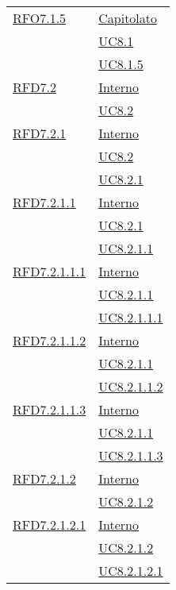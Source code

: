 \begin{longtable}{|>{\centering}m{5cm}|m{5cm}<{\centering}|}
\hyperlink{RFO7.1.5}{RFO7.1.5} & \hyperlink{Capitolato}{Capitolato}\\
& \hyperref[UC8.1]{UC8.1}\\
& \hyperref[UC8.1.5]{UC8.1.5}\\ \hline

\hyperlink{RFD7.2}{RFD7.2} & \hyperlink{Interno}{Interno}\\
& \hyperref[UC8.2]{UC8.2}\\ \hline

\hyperlink{RFD7.2.1}{RFD7.2.1} & \hyperlink{Interno}{Interno}\\
& \hyperref[UC8.2]{UC8.2}\\
& \hyperref[UC8.2.1]{UC8.2.1}\\ \hline

\hyperlink{RFD7.2.1.1}{RFD7.2.1.1} & \hyperlink{Interno}{Interno}\\
& \hyperref[UC8.2.1]{UC8.2.1}\\
& \hyperref[UC8.2.1.1]{UC8.2.1.1}\\ \hline

\hyperlink{RFD7.2.1.1.1}{RFD7.2.1.1.1} & \hyperlink{Interno}{Interno}\\
& \hyperref[UC8.2.1.1]{UC8.2.1.1}\\
& \hyperref[UC8.2.1.1.1]{UC8.2.1.1.1}\\ \hline

\hyperlink{RFD7.2.1.1.2}{RFD7.2.1.1.2} & \hyperlink{Interno}{Interno}\\
& \hyperref[UC8.2.1.1]{UC8.2.1.1}\\
& \hyperref[UC8.2.1.1.2]{UC8.2.1.1.2}\\ \hline

\hyperlink{RFD7.2.1.1.3}{RFD7.2.1.1.3} & \hyperlink{Interno}{Interno}\\
& \hyperref[UC8.2.1.1]{UC8.2.1.1}\\
& \hyperref[UC8.2.1.1.3]{UC8.2.1.1.3}\\ \hline

\hyperlink{RFD7.2.1.2}{RFD7.2.1.2} & \hyperlink{Interno}{Interno}\\
& \hyperref[UC8.2.1.2]{UC8.2.1.2}\\ \hline

\hyperlink{RFD7.2.1.2.1}{RFD7.2.1.2.1} & \hyperlink{Interno}{Interno}\\
& \hyperref[UC8.2.1.2]{UC8.2.1.2}\\
& \hyperref[UC8.2.1.2.1]{UC8.2.1.2.1}\\ \hline


\end{longtable}
